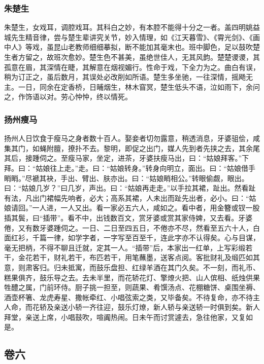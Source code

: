 \documentclass[]{article}
\begin{document}
\hypertarget{header-n423}{%
\subsubsection{朱楚生}\label{header-n423}}

朱楚生，女戏耳，调腔戏耳。其科白之妙，有本腔不能得十分之一者。盖四明姚益城先生精音律，尝与楚生辈讲究关节，妙入情理，如《江天暮雪》、《霄光剑》、《画中人》等戏，虽昆山老教师细细摹拟，断不能加其毫末也。班中脚色，足以鼓吹楚生者方留之，故班次愈妙。楚生色不甚美，虽绝世佳人，无其风韵。楚楚谡谡，其孤意在眉，其深情在睫，其解意在烟视媚行。性命于戏，下全力为之。曲白有误，稍为订正之，虽后数月，其误处必改削如所语。楚生多坐驰，一往深情，摇飏无主。一日，同余在定香桥，日晡烟生，林木窅冥，楚生低头不语，泣如雨下，余问之，作饰语以对。劳心忡忡，终以情死。

\hypertarget{header-n428}{%
\subsubsection{扬州瘦马}\label{header-n428}}

扬州人日饮食于瘦马之身者数十百人。娶妾者切勿露意，稍透消息，牙婆驵侩，咸集其门，如蝇附膻，撩扑不去。黎明，即促之出门，媒人先到者先挟之去，其余尾其后，接踵伺之。至瘦马家，坐定，进茶，牙婆扶瘦马出，曰：``姑娘拜客。''下拜。曰：``姑娘往上走。''走。曰：``姑娘转身。''转身向明立，面出。曰：``姑娘借手睄睄。''尽褫其袂，手出、臂出、肤亦出。曰：``姑娘睄相公。''转眼偷觑，眼出。曰：``姑娘几岁？''曰几岁，声出。曰：``姑娘再走走。''以手拉其裙，趾出。然看趾有法，凡出门裙幅先响者，必大；高系其裙，人未出而趾先出者，必小。曰：``姑娘请回。''一人进，一人又出。看一家必五六人，咸如之。看中者，用金簪或钗一股插其鬓，曰``插带''。看不中，出钱数百文，赏牙婆或赏其家侍婢，又去看。牙婆倦，又有数牙婆踵伺之。一日、二日至四五日，不倦亦不尽，然看至五六十人，白面红衫，千篇一律，如学字者，一字写至百至千，连此字亦不认得矣。心与目谋，毫无把柄，不得不聊且迁就，定其一人。``插带''后，本家出一红单，上写彩缎若干，金花若干，财礼若干，布匹若干，用笔蘸墨，送客点阅。客批财礼及缎匹如其意，则肃客归。归未抵寓，而鼓乐盘担、红绿羊酒在其门久矣。不一刻，而礼币、糕果俱齐，鼓乐导之去。去未半里，而花轿花灯、擎燎火把、山人傧相、纸烛供果牲醴之属，门前环侍。厨子挑一担至，则蔬果、肴馔汤点、花棚糖饼、桌围坐褥、酒壶杯箸、龙虎寿星、撒帐牵红、小唱弦索之类，又毕备矣。不待复命，亦不待主人命，而花轿及亲送小轿一齐往迎，鼓乐灯燎，新人轿与亲送轿一时俱到矣。新人拜堂，亲送上席，小唱鼓吹，喧阗热闹。日未午而讨赏遽去，急往他家，又复如是。

\hypertarget{header-n432}{%
\subsection{卷六}\label{header-n432}}
\end{document}

